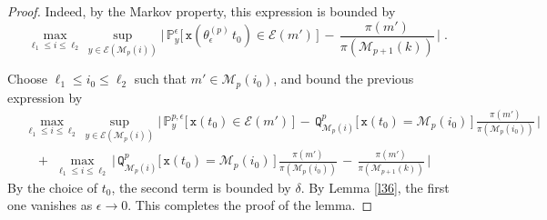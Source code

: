 \documentclass[reqno]{amsart}
\theoremstyle{plain}
\theoremstyle{definition}
\newcommand{\bb}[1]{{\mathbb #1}}
\newcommand{\ms}[1]{{\mathscr #1}}
\newcommand{\mtt}[1]{{\mathtt #1}}
\newcounter{as}[section]
\newcommand{\<}{\langle}
\renewcommand{\>}{\rangle}
\begin{document}
\begin{proof}
Indeed, by the Markov property, this expression is bounded by
\begin{equation*}
\max_{\ell_1\le i\le \ell_2} \sup_{y\in \ms E(\ms M_p(i))}
\Big|\, \bb P_y^{\epsilon } \big[\, \mtt x
(\theta_{\epsilon}^{(p)}\, t_{0}) \in \ms E(m')\,\big]
\,-\, \frac{\pi(m')}{\pi(\ms M_{p+1}(k))} \,\Big|\;.
\end{equation*}

Choose $\ell_1\le i_0\le \ell_2$ such that $m'\in \ms M_p(i_0)$, and bound
the previous expression by
\begin{equation*}
\begin{aligned}
& \max_{\ell_1\le i\le \ell_2} \sup_{y\in \ms E(\ms M_p(i))}
\Big|\, \bb P_y^{p,\epsilon } \big[\, \mtt x
(t_{0}) \in \ms E(m')\,\big]
\,-\, \mtt Q^p_{\ms M_p(i)} \big[\, \mtt x(t_0) = \ms M_p(i_0)\,]
\, \frac{\pi(m')}{\pi(\ms M_{p}(i_0))} \,\Big|
\\
&\quad +\,
\max_{\ell_1\le i\le \ell_2} 
\Big|\, \mtt Q^p_{\ms M_p(i)} \big[\, \mtt x(t_0) = \ms M_p(i_0)\,]
\, \frac{\pi(m')}{\pi(\ms M_{p}(i_0))} \,-\,
\frac{\pi(m')}{\pi(\ms M_{p+1}(k))} \,\Big|
\end{aligned}
\end{equation*}
By the choice of $t_0$, the second term is bounded by $\delta$.
By Lemma \ref{l36}, the first one vanishes as $\epsilon\to 0$. This
completes the proof of the lemma.
\end{proof}
\end{document}
